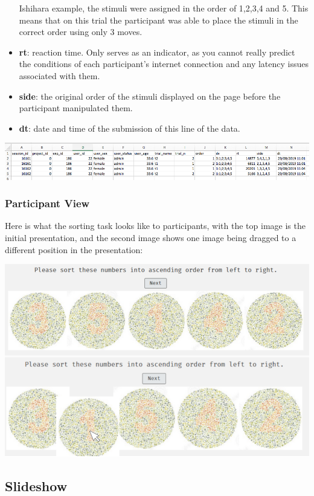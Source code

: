 \documentclass[]{book}
\begin{document}
\begin{itemize}
  Ishihara example, the stimuli were assigned in the order of 1,2,3,4
  and 5. This means that on this trial the participant was able to place
  the stimuli in the correct order using only 3 moves.
\item
  \textbf{rt}: reaction time. Only serves as an indicator, as you cannot
  really predict the conditions of each participant's internet
  connection and any latency issues associated with them.
\item
  \textbf{side}: the original order of the stimuli displayed on the page
  before the participant manipulated them.
\item
  \textbf{dt}: date and time of the submission of this line of the data.
\end{itemize}

\includegraphics{images/screenshots/data_sorting.png}

\subsubsection*{Participant View}\label{participant-view-5}

Here is what the sorting task looks like to participants, with the top
image is the initial presentation, and the second image shows one image
being dragged to a different position in the presentation:

\includegraphics{images/screenshots/view_sorting.png}

\subsection{Slideshow}\label{slideshow}
\end{document}
